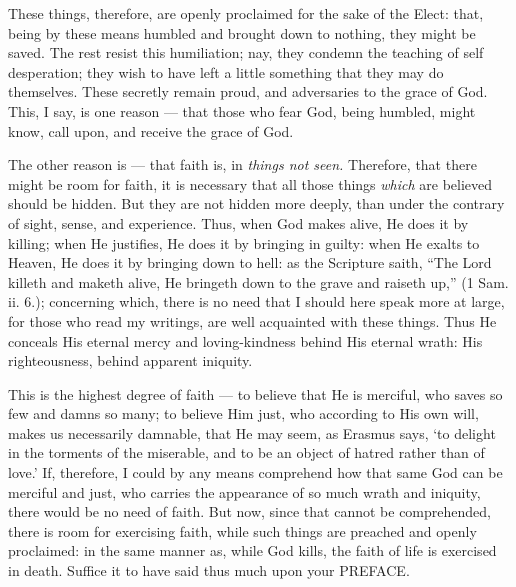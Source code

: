 These things, therefore, are openly proclaimed for the sake of the Elect: that, being by these means humbled and brought down to nothing, they might be saved. The rest resist this humiliation; nay, they condemn the teaching of self desperation; they wish to have left a little something that they may do themselves. These secretly remain proud, and adversaries to the grace of God. This, I say, is one reason — that those who fear God, being humbled, might know, call upon, and receive the grace of God.

The other reason is — that faith is, in \emph{things not seen. }Therefore, that there might be room for faith, it is necessary that all those things \emph{which }are believed should be hidden. But they are not hidden more deeply, than under the contrary of sight, sense, and experience. Thus, when God makes alive, He does it by killing; when He justifies, He does it by bringing in guilty: when He exalts to Heaven, He does it by bringing down to hell: as the Scripture saith, “The Lord killeth and maketh alive, He bringeth down to the grave and raiseth up,” (1 Sam. ii. 6.); concerning which, there is no need that I should here speak more at large, for those who read my writings, are well acquainted with these things. Thus He conceals His eternal mercy and loving-kindness behind His eternal wrath: His righteousness, behind apparent iniquity.

This is the highest degree of faith — to believe that He is merciful, who saves so few and damns so many; to believe Him just, who according to His own will, makes us necessarily damnable, that He may seem, as Erasmus says, ‘to delight in the torments of the miserable, and to be an object of hatred rather than of love.’ If, therefore, I could by any means comprehend how that same God can be merciful and just, who carries the appearance of so much wrath and iniquity, there would be no need of faith. But now, since that cannot be comprehended, there is room for exercising faith, while such things are preached and openly proclaimed: in the same manner as, while God kills, the faith of life is exercised in death. Suffice it to have said thus much upon your \textsc{PREFACE}.

